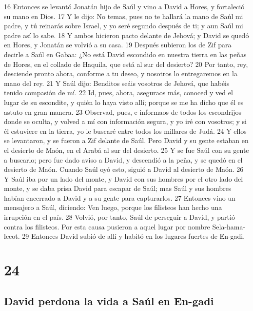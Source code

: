 16 Entonces se levantó Jonatán hijo de Saúl y vino a David a Hores, y fortaleció su mano en Dios.
17 Y le dijo: No temas, pues no te hallará la mano de Saúl mi padre, y tú reinarás sobre Israel, y yo seré segundo después de ti; y aun Saúl mi padre así lo sabe.
18 Y ambos hicieron pacto delante de Jehová; y David se quedó en Hores, y Jonatán se volvió a su casa.
19 Después subieron los de Zif para decirle a Saúl en Gabaa: ¿No está David escondido en nuestra tierra en las peñas de Hores, en el collado de Haquila, que está al sur del desierto?
20 Por tanto, rey, desciende pronto ahora, conforme a tu deseo, y nosotros lo entregaremos en la mano del rey.
21 Y Saúl dijo: Benditos seáis vosotros de Jehová, que habéis tenido compasión de mí.
22 Id, pues, ahora, aseguraos más, conoced y ved el lugar de su escondite, y quién lo haya visto allí; porque se me ha dicho que él es astuto en gran manera.
23 Observad, pues, e informaos de todos los escondrijos donde se oculta, y volved a mí con información segura, y yo iré con vosotros; y si él estuviere en la tierra, yo le buscaré entre todos los millares de Judá.
24 Y ellos se levantaron, y se fueron a Zif delante de Saúl. Pero David y su gente estaban en el desierto de Maón, en el Arabá al sur del desierto.
25 Y se fue Saúl con su gente a buscarlo; pero fue dado aviso a David, y descendió a la peña, y se quedó en el desierto de Maón. Cuando Saúl oyó esto, siguió a David al desierto de Maón.
26 Y Saúl iba por un lado del monte, y David con sus hombres por el otro lado del monte, y se daba prisa David para escapar de Saúl; mas Saúl y sus hombres habían encerrado a David y a su gente para capturarlos.
27 Entonces vino un mensajero a Saúl, diciendo: Ven luego, porque los filisteos han hecho una irrupción en el país.
28 Volvió, por tanto, Saúl de perseguir a David, y partió contra los filisteos. Por esta causa pusieron a aquel lugar por nombre Sela-hama-lecot.
29 Entonces David subió de allí y habitó en los lugares fuertes de En-gadi.

\chapter{24}

\section*{David perdona la vida a Saúl en En-gadi}

